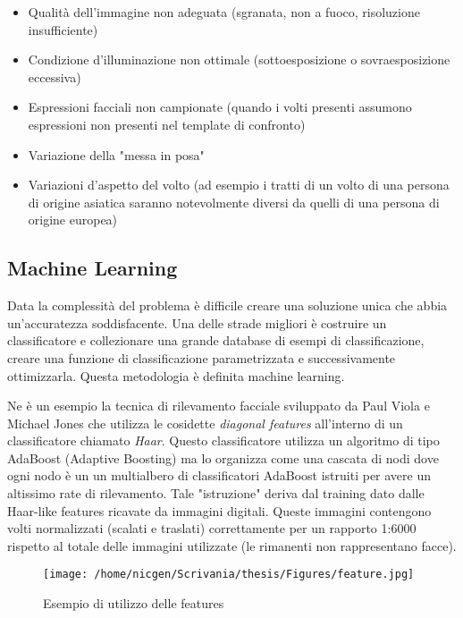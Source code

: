 \begin{itemize}
\item Qualità dell'immagine non adeguata (sgranata, non a fuoco, risoluzione insufficiente)
\item Condizione d'illuminazione non ottimale (sottoesposizione o sovraesposizione eccessiva)
\item Espressioni facciali non campionate (quando i volti presenti assumono espressioni non presenti nel template di confronto)
\item Variazione della "messa in posa"
\item Variazioni d'aspetto del volto (ad esempio i tratti di un volto di una persona di origine asiatica saranno notevolmente diversi da quelli di una persona di origine europea)
\end{itemize}

\subsection{Machine Learning}

Data la complessità del problema è difficile creare una soluzione unica che abbia un'accuratezza soddisfacente. Una delle strade migliori è costruire un classificatore e collezionare una grande database di esempi di classificazione, creare una funzione di classificazione parametrizzata e successivamente ottimizzarla. Questa metodologia è definita machine learning. 

Ne è un esempio la tecnica di rilevamento facciale sviluppato da Paul Viola e Michael Jones che utilizza le cosidette \textit{diagonal features} all'interno di un classificatore chiamato \textit{Haar}. Questo classificatore utilizza un algoritmo di tipo AdaBoost (Adaptive Boosting) ma lo organizza come una cascata di nodi dove ogni nodo è un un multialbero di classificatori AdaBoost istruiti per avere un altissimo rate di rilevamento. Tale "istruzione" deriva dal training dato dalle Haar-like features ricavate da immagini digitali. Queste immagini contengono volti normalizzati (scalati e traslati) correttamente per un rapporto 1:6000 rispetto al totale delle immagini utilizzate (le rimanenti non rappresentano facce).


\begin{figure}[H]\centering  
\texttt{[image: /home/nicgen/Scrivania/thesis/Figures/feature.jpg]}
\caption[Esempio di utilizzo delle features]{Esempio di utilizzo delle features}
\label{pic-a}
\end{figure}


